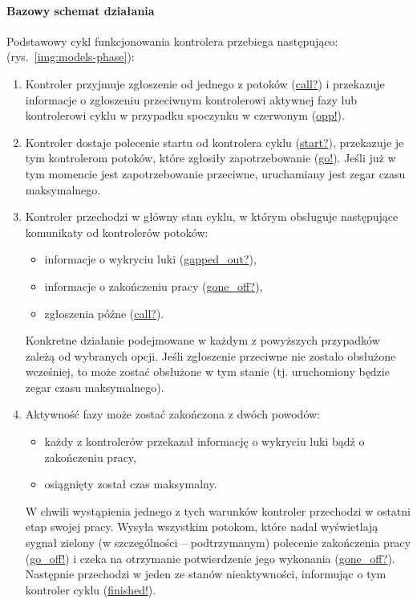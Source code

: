\documentclass{pracamgr}
\newcommand{\imgr}[1]{rys.~\ref{#1}}
\theoremstyle{plain}
\begin{document}
\paragraph{Bazowy schemat działania} Podstawowy cykl funkcjonowania
kontrolera przebiega następująco: (\imgr{img:models-phase}):
\begin{enumerate}
  \item Kontroler przyjmuje zgłoszenie od jednego z potoków (\url{call?}) i
  przekazuje informacje o zgłoszeniu przeciwnym kontrolerowi aktywnej
  fazy lub kontrolerowi cyklu w przypadku spoczynku w czerwonym (\url{opp!}).
  \item Kontroler dostaje polecenie startu od kontrolera cyklu
  (\url{start?}), przekazuje je tym kontrolerom potoków, które
  zgłosiły zapotrzebowanie (\url{go!}). Jeśli już w tym momencie jest
  zapotrzebowanie przeciwne, uruchamiany jest zegar czasu
  maksymalnego.
  \item Kontroler przechodzi w główny stan cyklu, w którym obsługuje
  następujące komunikaty od kontrolerów potoków:
  \begin{itemize}
    \item informacje o wykryciu luki (\url{gapped_out?}),
    \item informacje o zakończeniu pracy (\url{gone_off?}),
    \item zgłoszenia późne (\url{call?}).
  \end{itemize}
  Konkretne działanie podejmowane w każdym z powyższych przypadków
  zależą od wybranych opcji. Jeśli zgłoszenie przeciwne nie zostało
  obsłużone wcześniej, to może zostać obsłużone w tym stanie
  (tj. uruchomiony będzie zegar czasu maksymalnego).
  \item Aktywność fazy może zostać zakończona z dwóch powodów:
  \begin{itemize}
    \item każdy z kontrolerów przekazał informację o wykryciu luki
    bądź o zakończeniu pracy,
    \item osiągnięty został czas maksymalny.
  \end{itemize}
  W chwili wystąpienia jednego z tych warunków kontroler przechodzi w
  ostatni etap swojej pracy. Wysyła wszystkim potokom, które nadal
  wyświetlają sygnał zielony (w szczególności -- podtrzymanym)
  polecenie zakończenia pracy (\url{go_off!}) i czeka na otrzymanie
  potwierdzenie jego wykonania (\url{gone_off?}). Następnie przechodzi
  w jeden ze stanów nieaktywności, informując o tym kontroler cyklu
  (\url{finished!}).
\end{enumerate}
\end{document}
